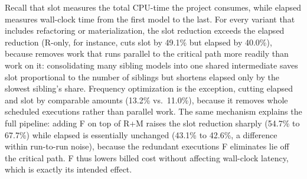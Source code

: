 
  Recall that slot measures the total CPU-time the project consumes, while elapsed measures wall-clock time from the first model to the last. For every variant that includes refactoring or materialization, the slot reduction exceeds the elapsed reduction (R-only, for instance, cuts slot by 49.1\% but elapsed by 40.0\%), because \tool{} removes work that runs parallel to the critical path more readily than work on it: consolidating many sibling models into one shared intermediate saves slot proportional to the number of siblings but shortens elapsed only by the slowest sibling's share. Frequency optimization is the exception, cutting elapsed and slot by comparable amounts (13.2\% vs.\ 11.0\%), because it removes whole scheduled executions rather than parallel work. The same mechanism explains the full pipeline: adding F on top of R+M raises the slot reduction sharply (54.7\% to 67.7\%) while elapsed is essentially unchanged (43.1\% to 42.6\%, a difference within run-to-run noise), because the redundant executions F eliminates lie off the critical path. F thus lowers billed cost without affecting wall-clock latency, which is exactly its intended effect.




